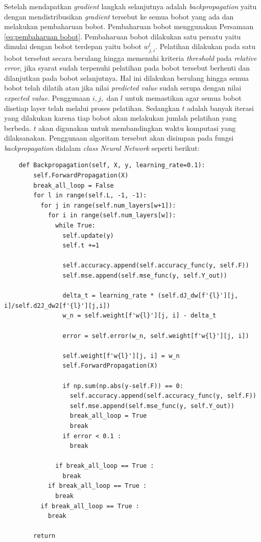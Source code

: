 Setelah mendapatkan \textit{gradient} langkah selanjutnya adalah \textit{backpropagation} yaitu dengan mendistribusikan \textit{gradient} tersebut ke semua bobot yang ada dan melakukan pembaharuan bobot. Pembaharuan bobot menggunakan Persamaan \ref{eq:pembaharuan bobot}. Pembaharuan bobot dilakukan satu persatu yaitu dimulai dengan bobot terdepan yaitu bobot $w^l_{j,i}$. Pelatihan dilakukan pada satu bobot tersebut secara berulang hingga memenuhi kriteria \textit{threshold} pada \textit{relative error}, jika syarat sudah terpenuhi pelatihan pada bobot tersebut berhenti dan dilanjutkan pada bobot selanjutnya. Hal ini dilakukan berulang hingga semua bobot telah dilatih atau jika nilai \textit{predicted value} sudah serupa dengan nilai \textit{expected value}. Penggunaan $i, j,$ dan $l$ untuk memastikan agar semua bobot disetiap layer telah melalui proses pelatihan. Sedangkan $t$ adalah banyak iterasi yang dilakukan karena tiap bobot akan melakukan jumlah pelatihan yang berbeda. $t$ akan digunakan untuk membandingkan waktu komputasi yang dilaksanakan. Penggunaan algoritam tersebut akan disimpan pada fungsi \textit{backpropagation} didalam \textit{class Neural Network} seperti berikut:

\begin{lstlisting}
    def Backpropagation(self, X, y, learning_rate=0.1):
        self.ForwardPropagation(X)
        break_all_loop = False
        for l in range(self.L, -1, -1):
          for j in range(self.num_layers[w+1]):
            for i in range(self.num_layers[w]):
              while True:
                self.update(y)
                self.t +=1

                self.accuracy.append(self.accuracy_func(y, self.F))
                self.mse.append(self.mse_func(y, self.Y_out))

                delta_t = learning_rate * (self.dJ_dw[f'{l}'][j, i]/self.d2J_dw2[f'{l}'][j,i])
                w_n = self.weight[f'w{l}'][j, i] - delta_t

                error = self.error(w_n, self.weight[f'w{l}'][j, i])

                self.weight[f'w{l}'][j, i] = w_n
                self.ForwardPropagation(X)

                if np.sum(np.abs(y-self.F)) == 0:
                  self.accuracy.append(self.accuracy_func(y, self.F))
                  self.mse.append(self.mse_func(y, self.Y_out))
                  break_all_loop = True
                  break
                if error < 0.1 :
                  break

              if break_all_loop == True :
                break
            if break_all_loop == True :
              break
          if break_all_loop == True :
            break

        return
\end{lstlisting}

